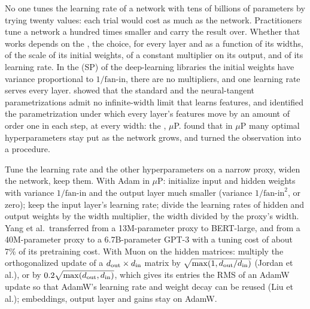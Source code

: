 \begin{refsection}
No one tunes the learning rate of a network with tens of billions of parameters by trying twenty values: each trial would cost as much as the network. Practitioners tune a network a hundred times smaller and carry the result over. Whether that works depends on the , the choice, for every layer and as a function of its widths, of the scale of its initial weights, of a constant multiplier on its output, and of its learning rate. In the  (SP) of the deep-learning libraries the initial weights have variance proportional to $1/\text{fan-in}$, there are no multipliers, and one learning rate serves every layer. \Textcite{YangHu2021} showed that the standard and the neural-tangent parametrizations admit no infinite-width limit that learns features, and identified the parametrization under which every layer's features move by an amount of order one in each step, at every width: the , $\mu$P. \Textcite{YangEtAl2021} found that in $\mu$P many optimal hyperparameters stay put as the network grows, and turned the observation into a procedure.

\begin{practice}
Tune the learning rate and the other hyperparameters on a narrow proxy, widen the network, keep them. With Adam in $\mu$P: initialize input and hidden weights with variance $1/\text{fan-in}$ and the output layer much smaller (variance $1/\text{fan-in}^2$, or zero); keep the input layer's learning rate; divide the learning rates of hidden and output weights by the width multiplier, the width divided by the proxy's width. Yang et al.\ transferred from a 13M-parameter proxy to BERT-large, and from a 40M-parameter proxy to a 6.7B-parameter GPT-3 with a tuning cost of about 7\% of its pretraining cost. With Muon on the hidden matrices: multiply the orthogonalized update of a $d_{\mathrm{out}}\times d_{\mathrm{in}}$ matrix by $\sqrt{\max(1,d_{\mathrm{out}}/d_{\mathrm{in}})}$ (Jordan et al.), or by $0.2\sqrt{\max(d_{\mathrm{out}},d_{\mathrm{in}})}$, which gives its entries the RMS of an AdamW update so that AdamW's learning rate and weight decay can be reused (Liu et al.); embeddings, output layer and gains stay on AdamW.
\end{practice}


\end{refsection}
